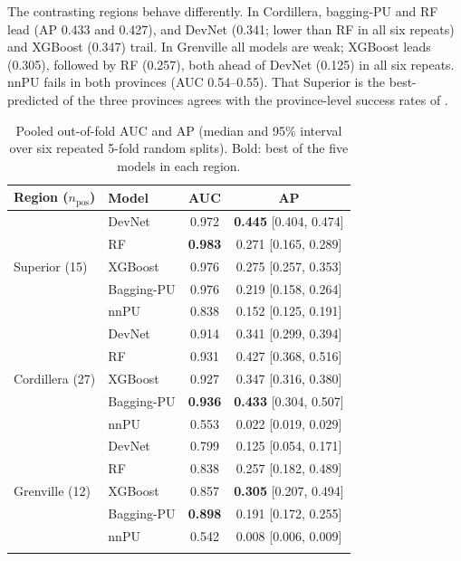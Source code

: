 \documentclass[pdflatex,sn-apa]{sn-jnl}
\begin{document}
The contrasting regions behave differently. In Cordillera, bagging-PU and RF lead (AP 0.433 and 0.427), and DevNet (0.341; lower than RF in all six repeats) and XGBoost (0.347) trail. In Grenville all models are weak; XGBoost leads (0.305), followed by RF (0.257), both ahead of DevNet (0.125) in all six repeats. nnPU fails in both provinces (AUC 0.54--0.55). That Superior is the best-predicted of the three provinces agrees with the province-level success rates of \citet{Parsa2024}.

\begin{table}[t]
\caption{Pooled out-of-fold AUC and AP (median and 95\% interval over six repeated 5-fold random splits). Bold: best of the five models in each region.}\label{tab:benchmark}
\footnotesize
\begin{tabular*}{\textwidth}{@{\extracolsep\fill}llcc}
\toprule
Region ($n_{\mathrm{pos}}$) & Model & AUC & AP \\
\midrule
\multirow{5}{*}{Superior (15)} & DevNet & 0.972 & \textbf{0.445} [0.404, 0.474] \\
 & RF & \textbf{0.983} & 0.271 [0.165, 0.289] \\
 & XGBoost & 0.976 & 0.275 [0.257, 0.353] \\
 & Bagging-PU & 0.976 & 0.219 [0.158, 0.264] \\
 & nnPU & 0.838 & 0.152 [0.125, 0.191] \\
\midrule
\multirow{5}{*}{Cordillera (27)} & DevNet & 0.914 & 0.341 [0.299, 0.394] \\
 & RF & 0.931 & 0.427 [0.368, 0.516] \\
 & XGBoost & 0.927 & 0.347 [0.316, 0.380] \\
 & Bagging-PU & \textbf{0.936} & \textbf{0.433} [0.304, 0.507] \\
 & nnPU & 0.553 & 0.022 [0.019, 0.029] \\
\midrule
\multirow{5}{*}{Grenville (12)} & DevNet & 0.799 & 0.125 [0.054, 0.171] \\
 & RF & 0.838 & 0.257 [0.182, 0.489] \\
 & XGBoost & 0.857 & \textbf{0.305} [0.207, 0.494] \\
 & Bagging-PU & \textbf{0.898} & 0.191 [0.172, 0.255] \\
 & nnPU & 0.542 & 0.008 [0.006, 0.009] \\
\botrule
\end{tabular*}
\end{table}
\end{document}
